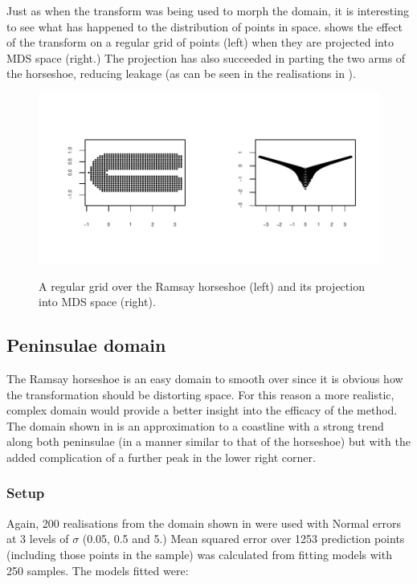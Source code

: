Just as when the \sch transform was being used to morph the domain, it is interesting to see what has happened to the distribution of points in space.  shows the effect of the transform on a regular grid of points (left) when they are projected into MDS space (right.) The projection has also succeeded in parting the two arms of the horseshoe, reducing leakage (as can be seen in the realisations in ).

\begin{figure}
\centering
\includegraphics[width=6in,trim=0.5in 0.5in 0in 0.5in]{mds/figs/mdsrampoints.pdf} \\
\caption{A regular grid over the Ramsay horseshoe (left) and its projection into MDS space (right).}
\label{mdsrampoints}
\end{figure}


\subsection{Peninsulae domain}

The Ramsay horseshoe is an easy domain to smooth over since it is obvious how the transformation should be distorting space. For this reason a more realistic, complex domain would provide a better insight into the efficacy of the method. The domain shown in  is an approximation to a coastline with a strong trend along both peninsulae (in a manner similar to that of the horseshoe) but with the added complication of a further peak in the lower right corner.

\subsubsection{Setup}

Again, 200 realisations from the domain shown in  were used with Normal errors at 3 levels of $\sigma$ (0.05, 0.5 and 5.) Mean squared error over 1253 prediction points (including those points in the sample) was calculated from fitting models with 250 samples. The models fitted were:

